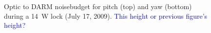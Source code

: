 \begin{figure}
\begin{centering}
\caption[Optic to DARM noisebudget for pitch and yaw]{Optic to DARM
  noisebudget for pitch (top) and yaw (bottom) during a 14~W lock
  (July 17, 2009). \textcolor{blue}{This height or previous figure's
    height?}}
\label{fig:}
\end{centering}
\end{figure}

